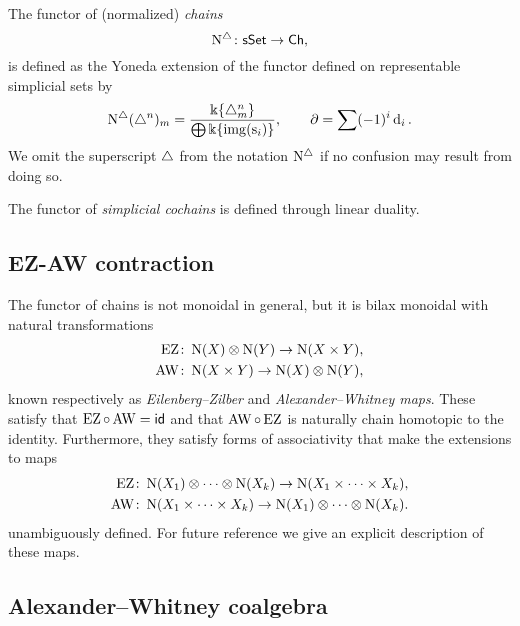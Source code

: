 The functor of (normalized) \textit{chains}
\[
\operatorname{N^{\triangle}} \colon \mathsf{sSet} \to \mathsf{Ch},
\]
is defined as the Yoneda extension of the functor defined on representable simplicial sets by
\[
\operatorname{N^{\triangle}}(\triangle^n)_m =
\frac{\Bbbk\{\triangle^n_m\}}{\bigoplus \Bbbk\{\mathrm{img}(\operatorname{s}_i)\}},
\qquad
\operatorname{\partial} = \sum (-1)^i \operatorname{d}_i.
\]
We omit the superscript $\triangle$ from the notation $\operatorname{N^{\triangle}}$ if no confusion may result from doing so.

The functor of \textit{simplicial cochains} is defined through linear duality.

\subsection{EZ-AW contraction}

The functor of chains is not monoidal in general, but
it is bilax monoidal with natural transformations
\[
\begin{split}
\operatorname{EZ} & \colon \operatorname{N}(X) \otimes \operatorname{N}(Y) \to \operatorname{N}(X \times Y), \\
\operatorname{AW} & \colon \operatorname{N}(X \times Y) \to \operatorname{N}(X) \otimes \operatorname{N}(Y),
\end{split}
\]
known respectively as \textit{Eilenberg--Zilber} and \textit{Alexander--Whitney maps}.
These satisfy that $\operatorname{EZ} \circ \operatorname{AW} = \mathsf{id}$ and that $\operatorname{AW} \circ \operatorname{EZ}$ is naturally chain homotopic to the identity.
Furthermore, they satisfy forms of associativity that make the extensions to maps
\[
\begin{split}
\operatorname{EZ} & \colon \operatorname{N}(X_1) \otimes \dotsb \otimes \operatorname{N}(X_k) \to \operatorname{N}(X_1 \times \dotsb \times X_k), \\
\operatorname{AW} & \colon \operatorname{N}(X_1 \times \dotsb \times X_k) \to \operatorname{N}(X_1) \otimes \dotsb \otimes \operatorname{N}(X_k).
\end{split}
\]
unambiguously defined.
For future reference we give an explicit description of these maps.


\subsection{Alexander--Whitney coalgebra}

